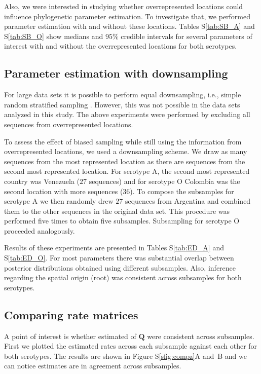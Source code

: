 \documentclass[a4paper,10pt]{article}
\begin{document}
Also, we were interested in studying whether overrepresented locations could influence phylogenetic parameter estimation.
To investigate that, we performed parameter estimation with and without these locations.
Tables S\ref{tab:SB_A} and S\ref{tab:SB_O} show medians and $95 \%$ credible intervals for several parameters of interest with and without the overrepresented locations
for both serotypes.
\subsection{Parameter estimation with downsampling}

For large data sets it is possible to perform equal downsampling, i.e., simple random stratified sampling \cite{fluPNAS}.
However, this was not possible in the data sets analyzed in this study.
The above experiments were performed by excluding all sequences from overrepresented locations.

To assess the effect of biased sampling while still using the information from overrepresented locations, we used a downsampling scheme.
We draw as many sequences from the most represented location as there are sequences from the second most represented location.
For serotype A, the second most represented country was Venezuela ($27$ sequences) and for serotype O Colombia was the second location with more sequences ($36$).
To compose the subsamples for serotype A we then randomly drew $27$ sequences from Argentina and combined them to the other sequences in the original data set.
This procedure was performed five times to obtain five subsamples.
Subsampling for serotype O proceeded analogously.

Results of these experiments are presented in Tables S\ref{tab:ED_A} and S\ref{tab:ED_O}.
For most parameters there was substantial overlap between posterior distributions obtained using different subsamples.
Also, inference regarding the spatial origin (root) was consistent across subsamples for both serotypes.

\subsection{Comparing rate matrices}
A point of interest is whether estimated of $\mathbf{Q}$ were consistent across subsamples.
First we plotted the estimated rates across each subsample against each other for both serotypes.
The results are shown in Figure S\ref{sfig:compz}A and~B and we can notice estimates are in agreement across subsamples.
\end{document}
